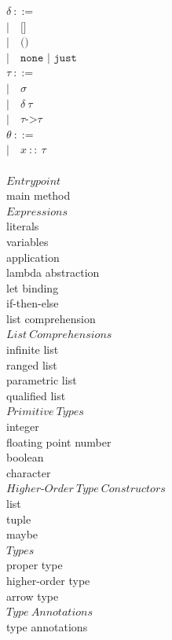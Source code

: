 \documentclass[5pt]{article}
\begin{document}
\begin{multicols}{2}
\noindent $\delta \ ::= $ \\
\hspace*{10mm} $| \quad \texttt{[]} $ \\
\hspace*{10mm} $| \quad \texttt{()} $ \\
\hspace*{10mm} $| \quad \texttt{none | just} $ \\

\noindent $\tau \ ::= $ \\
\hspace*{10mm} $| \quad \sigma $ \\
\hspace*{10mm} $| \quad \delta \ \tau $ \\
\hspace*{10mm} $| \quad \tau \texttt{->} \tau $ \\

\noindent $\theta \ ::= $ \\
\hspace*{10mm} $| \quad x \ :: \  \tau $ \\
\columnbreak \\
$Entrypoint$ \\
main method \\

\noindent $Expressions$ \\
literals \\
variables \\
application \\
lambda abstraction \\
let binding \\
if-then-else \\
list comprehension \\

\noindent $List \ Comprehensions$ \\
infinite list \\
ranged list \\
parametric list \\
qualified list \\

\noindent $Primitive \ Types$ \\
integer \\
floating point number \\
boolean \\
character \\

\noindent $Higher\text{-}Order \ Type \ Constructors$ \\
list \\
tuple \\
maybe \\

\noindent $Types$ \\
proper type \\
higher-order type \\
arrow type \\

\noindent $Type \ Annotations$ \\
type annotations \\
\end{multicols}
\end{document}
